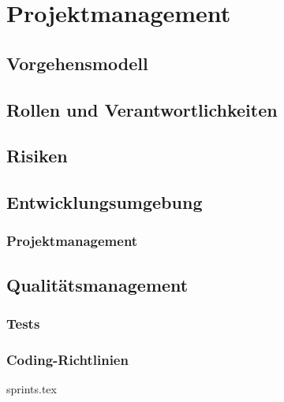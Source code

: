 \part{Projektmanagement}

\chapter{Vorgehensmodell}


\chapter{Rollen und Verantwortlichkeiten}


\chapter{Risiken}\label{sec:risiken}


\chapter{Entwicklungsumgebung}


\section{Projektmanagement}


\chapter{Qualitätsmanagement}

\section{Tests}



\section{Coding-Richtlinien}


{sprints.tex}


